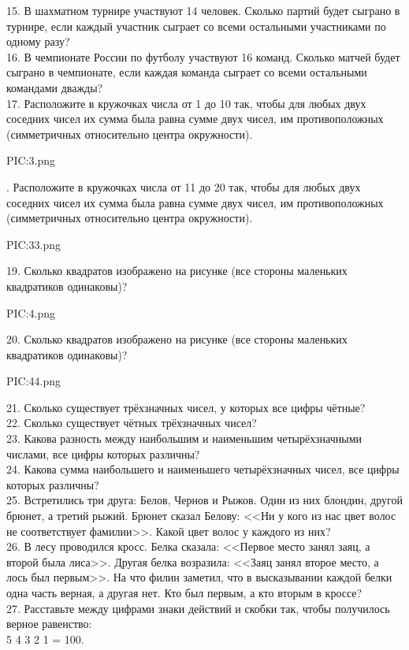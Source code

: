 15. В шахматном турнире участвуют 14 человек. Сколько партий будет сыграно в турнире, если каждый участник сыграет со всеми остальными участниками по одному разу?\\
16. В чемпионате России по футболу участвуют 16 команд. Сколько матчей будет сыграно в чемпионате, если каждая команда сыграет со всеми остальными командами дважды?\\
17. Расположите в кружочках числа от 1 до 10 так, чтобы для любых двух соседних чисел их сумма была равна сумме двух чисел, им противоположных (симметричных относительно центра окружности).
\begin{center}
{{PIC:3.png}}
\end{center}
\newpage
{}. Расположите в кружочках числа от 11 до 20 так, чтобы для любых двух соседних чисел их сумма была равна сумме двух чисел, им противоположных (симметричных относительно центра окружности).
\begin{center}
{{PIC:33.png}}
\end{center}
19. Сколько квадратов изображено на рисунке (все стороны маленьких квадратиков одинаковы)?
\begin{center}
{{PIC:4.png}}
\end{center}
20. Сколько квадратов изображено на рисунке (все стороны маленьких квадратиков одинаковы)?
\begin{center}
{{PIC:44.png}}
\end{center}
21. Сколько существует трёхзначных чисел, у которых все цифры чётные?\\
22. Сколько существует чётных трёхзначных чисел?\\
23. Какова разность между наибольшим и наименьшим четырёхзначными числами, все цифры которых различны?\\
24. Какова сумма наибольшего и наименьшего четырёхзначных чисел, все цифры которых различны?\\
25. Встретились три друга: Белов, Чернов и Рыжов. Один из них блондин, другой брюнет, а третий рыжий. Брюнет сказал Белову: <<Ни у кого из нас цвет волос не соответствует фамилии>>. Какой цвет волос у каждого из них?\\
26. В лесу проводился кросс. Белка сказала: <<Первое место занял заяц, а второй была лиса>>. Другая белка возразила: <<Заяц занял второе место, а лось был первым>>. На что филин заметил, что в высказывании каждой белки одна часть верная, а другая нет. Кто был первым, а кто вторым в кроссе?\\
27. Расставьте между цифрами знаки действий и скобки так, чтобы получилось верное равенство:\\ 5 4 3 2 1 = 100.\\
